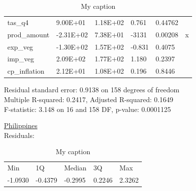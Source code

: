 \documentclass[12pt,a4paper,english]{article}
\begin{document}
\begin{table}[!htbp]
\begin{tabular}{llllll}
tas\_q4                & 9.00E+01  & 1.18E+02   & 0.761   & 0.44762             &             \\
prod\_amount           & -2.31E+02 & 7.38E+01   & -3131   & 0.00208             & x           \\
exp\_veg               & -1.30E+02 & 1.57E+02   & -0.831  & 0.4075              &             \\
imp\_veg               & 2.09E+02  & 1.77E+02   & 1.180   & 0.2397              &             \\
cp\_inflation          & 2.12E+01  & 1.08E+02   & 0.196   & 0.8446              &            \\ \hline
\end{tabular}
\caption{My caption}
\label{my-label}
\end{table}
\FloatBarrier
Residual standard error: 0.9138 on 158 degrees of freedom \\
Multiple R-squared:  0.2417,	Adjusted R-squared:  0.1649 \\
F-statistic: 3.148 on 16 and 158 DF,  p-value: 0.0001125


\underline{Philippines} \\
Residuals:
\FloatBarrier
\begin{table}[!htbp]
\centering
\begin{tabular}{lllll}
Min     & 1Q      & Median  & 3Q     & Max    \\
-1.0930 & -0.4379 & -0.2995 & 0.2246 & 2.3262
\end{tabular}
\caption{My caption}
\label{my-label}
\end{table}
\FloatBarrier
\end{document}
